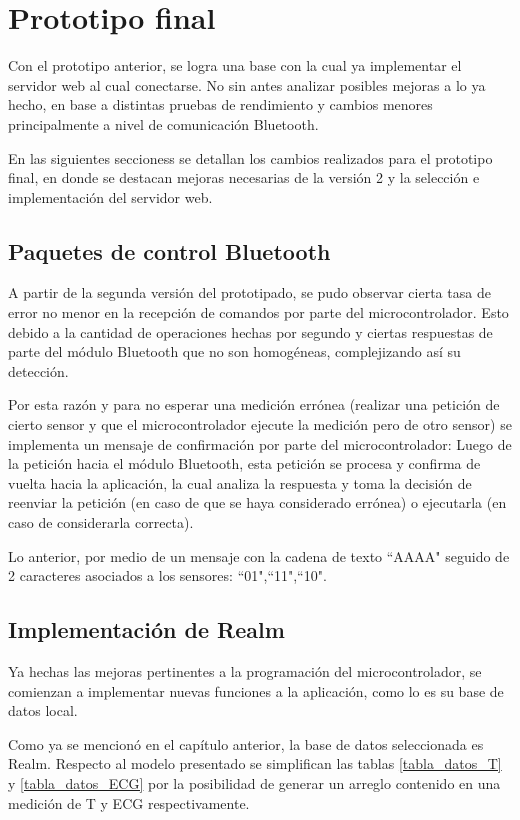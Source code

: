 \chapter{Prototipo final}\label{protof}

Con el prototipo anterior, se logra una base con la cual ya implementar el servidor web al cual conectarse. No sin antes analizar posibles mejoras a lo ya hecho, en base a distintas pruebas de rendimiento y cambios menores principalmente a nivel de comunicación Bluetooth.

En las siguientes seccioness se detallan los cambios realizados para el prototipo final, en donde se destacan mejoras necesarias de la versión 2 y la selección e implementación del servidor web.

\section{Paquetes de control Bluetooth}

A partir de la segunda versión del prototipado, se pudo observar cierta tasa de error no menor en la recepción de comandos por parte del microcontrolador. Esto debido a la cantidad de operaciones hechas por segundo y ciertas respuestas de parte del módulo Bluetooth que no son homogéneas, complejizando así su detección.

Por esta razón y para no esperar una medición errónea (realizar una petición de cierto sensor y que el microcontrolador ejecute la medición pero de otro sensor) se implementa un mensaje de confirmación por parte del microcontrolador: Luego de la petición hacia el módulo Bluetooth, esta petición se procesa y confirma de vuelta hacia la aplicación, la cual analiza la respuesta y toma la decisión de reenviar la petición (en caso de que se haya considerado errónea) o ejecutarla (en caso de considerarla correcta).

Lo anterior, por medio de un mensaje con la cadena de texto ``AAAA" seguido de 2 caracteres asociados a los sensores: ``01",``11",``10".

\section{Implementación de Realm}

Ya hechas las mejoras pertinentes a la programación del microcontrolador, se comienzan a implementar nuevas funciones a la aplicación, como lo es su base de datos local.

Como ya se mencionó en el capítulo anterior, la base de datos seleccionada es Realm. Respecto al modelo presentado se simplifican las tablas \ref{tabla_datos_T} y \ref{tabla_datos_ECG} por la posibilidad de generar un arreglo contenido en una medición de T y ECG respectivamente. 

